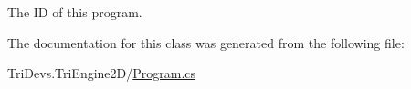The I\-D of this program. 



The documentation for this class was generated from the following file\-:\begin{DoxyCompactItemize}
\item 
Tri\-Devs.\-Tri\-Engine2\-D/\hyperlink{_program_8cs}{Program.\-cs}\end{DoxyCompactItemize}
